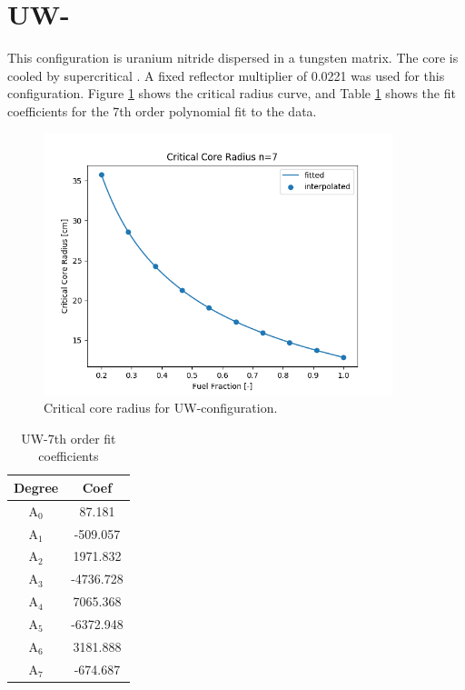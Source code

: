 \clearpage
\section{UW-\water}
This configuration is uranium nitride dispersed in a tungsten matrix. The core
is cooled by supercritical \water. A fixed reflector multiplier of 0.0221 was
used for this configuration. Figure \ref{fig:core_r_un_h2o} shows the critical
radius curve, and Table \ref{tab:un_h2o_fit_coeffs} shows the fit coefficients
for the 7th order polynomial fit to the data.

\begin{figure}[h]
    \centering
    \includegraphics[width=4in]{../images/core_r_un_h2o.png}
\caption{Critical core radius for UW-\water configuration.}
\label{fig:core_r_un_h2o}
\end{figure}


\begin{table}[h]
  \centering
  \caption{UW-\water 7th order fit coefficients}
  \begin{tabular}{cc}
    \toprule
     Degree & Coef\\ 
    \midrule                                  
    A$_0$  &  87.181\\
    A$_1$  &  -509.057\\
    A$_2$  &  1971.832\\
    A$_3$  &  -4736.728\\
    A$_4$  &  7065.368\\
    A$_5$  &  -6372.948\\
    A$_6$  &  3181.888\\
    A$_7$  &  -674.687\\
  \end{tabular}
  \label{tab:un_h2o_fit_coeffs}
\end{table}

